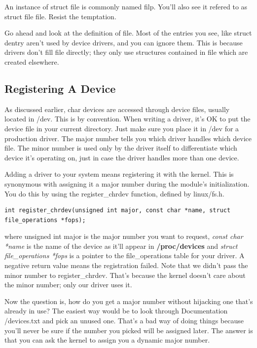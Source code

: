 \documentclass[11pt]{article}
\begin{document}
An instance of struct file is commonly named filp. You'll also see it refered to as struct file file. Resist the temptation.

Go ahead and look at the definition of file. Most of the entries you see, like struct dentry aren't used by device drivers, and you can ignore them. This is because drivers don't fill file directly; they only use structures contained in file which are created elsewhere.

\subsection{Registering A Device}
\label{sec:orgc4872a1}
As discussed earlier, char devices are accessed through device files, usually located in /dev. This is by convention. When writing a driver, it's OK to put the device file in your current directory. Just make sure you place it in /dev for a production driver. The major number tells you which driver handles which device file. The minor number is used only by the driver itself to differentiate which device it's operating on, just in case the driver handles more than one device.

Adding a driver to your system means registering it with the kernel. This is synonymous with assigning it a major number during the module's initialization. You do this by using the register\_chrdev function, defined by linux/fs.h.

\begin{verbatim}
int register_chrdev(unsigned int major, const char *name, struct file_operations *fops);
\end{verbatim}

where unsigned int major is the major number you want to request, \emph{const char *name} is the name of the device as it'll appear in \textbf{/proc/devices} and \emph{struct file\_operations *fops} is a pointer to the file\_operations table for your driver. A negative return value means the registration failed. Note that we didn't pass the minor number to register\_chrdev. That's because the kernel doesn't care about the minor number; only our driver uses it.

Now the question is, how do you get a major number without hijacking one that's already in use? The easiest way would be to look through Documentation /devices.txt and pick an unused one. That's a bad way of doing things because you'll never be sure if the number you picked will be assigned later. The answer is that you can ask the kernel to assign you a dynamic major number.
\end{document}
